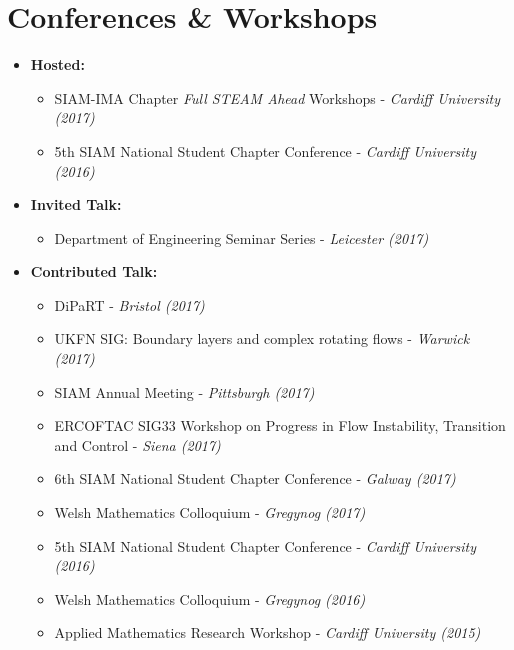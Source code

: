 \documentclass[11pt,a4paper,sans]{moderncv}        %
\begin{document}
\section{Conferences \& Workshops}

\vspace{6pt}

\begin{itemize}

\item{\textbf{Hosted:}
\begin{itemize}
\vspace{3pt}
\item SIAM-IMA Chapter \textit{Full STEAM Ahead} Workshops - \textit{Cardiff University (2017)}
\vspace{3pt}
\item 5th SIAM National Student Chapter Conference - \textit{Cardiff University (2016)}
\end{itemize}}

\vspace{6pt}

\item{\textbf{Invited Talk:}
\begin{itemize}
\vspace{3pt}
\item Department of Engineering Seminar Series - \textit{Leicester (2017)}
\vspace{3pt}
\end{itemize}}


\vspace{6pt}

\item{\textbf{Contributed Talk:}
\begin{itemize}
\vspace{3pt}
\item DiPaRT - \textit{Bristol (2017)}
\vspace{3pt}
\item UKFN SIG: Boundary layers and complex rotating flows - \textit{Warwick (2017)}
\vspace{3pt}
\item SIAM Annual Meeting - \textit{Pittsburgh (2017)}
\vspace{3pt}
\item ERCOFTAC SIG33 Workshop on Progress in Flow Instability, Transition
and Control - \textit{Siena (2017)}
\vspace{3pt}
\item 6th SIAM National Student Chapter Conference - \textit{Galway (2017)}
\vspace{3pt}
\item Welsh Mathematics Colloquium - \textit{Gregynog (2017)}
\vspace{3pt}
\item 5th SIAM National Student Chapter Conference - \textit{Cardiff University (2016)}
\vspace{3pt}
\item Welsh Mathematics Colloquium - \textit{Gregynog (2016)}
\vspace{3pt}
\item Applied Mathematics Research Workshop - \textit{Cardiff University (2015)}
\end{itemize}}


\end{itemize}
\end{document}
